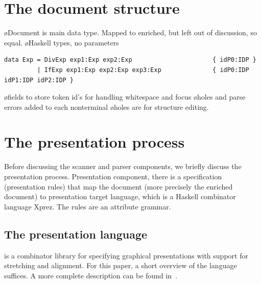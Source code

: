 \documentclass[12pt]{article}
\begin{document}
%
\section{The document structure}
%


\bl
\o Document is main data type. Mapped to enriched, but left out of discussion, so equal.
\o Haskell types, no parameters
\el
\begin{footnotesize}
\begin{verbatim}
data Exp = DivExp exp1:Exp exp2:Exp                      { idP0:IDP }
         | IfExp exp1:Exp exp2:Exp exp3:Exp              { idP0:IDP idP1:IDP idP2:IDP }
\end{verbatim}
\end{footnotesize}

\bl
\o fields to store token id's for handling whitespace and focus
\o holes and parse errors added to each nonterminal
\o holes are for structure editing.
\el


\section{The presentation process}

Before discussing the scanner and parser components, we briefly discuss the presentation process. Presentation component, there is a specification (presentation rules) that map the document (more precisely the enriched document) to presentation target language, which is a Haskell combinator language Xprez. The rules are an attribute grammar.

%
\subsection{The {\Xprez} presentation language} \label{sect:xprez}
%

\Xprez is a combinator library for specifying graphical presentations with support for stretching and alignment. For this paper, a short overview of the language suffices. A more complete description can be found in~\cite{schrage04Proxima}.
\end{document}
